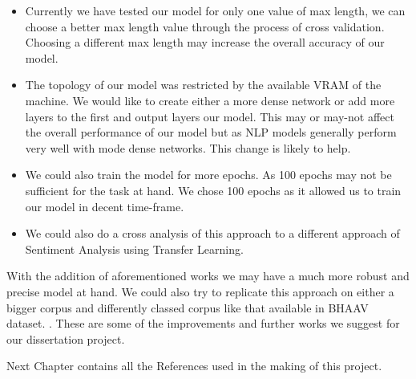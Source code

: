 \documentclass[a4paper, 12pt]{article}
\begin{document}
\begin{sloppypar}
\begin{itemize}
  \item Currently we have tested our model for only one value of max length, we can choose a better max length value through the process of cross validation. Choosing a different max length may increase the overall accuracy of our model.
  
  \item The topology of our model was restricted by the available VRAM of the machine. We would like to create either a more dense network or add more layers to the first and output layers our model. This may or may-not affect the overall performance of our model but as NLP models generally perform very well with mode dense networks. This change is likely to help.
  
  \item We could also train the model for more epochs. As 100 epochs may not be sufficient for the task at hand. We chose 100 epochs as it allowed us to train our model in decent time-frame.
  
  \item We could also do a cross analysis of this approach to a different approach of Sentiment Analysis using Transfer Learning.
  \end{itemize}   
  With the addition of aforementioned works we may have a much more robust and precise model at hand. We could also try to replicate this approach on either a bigger corpus and differently classed corpus like that available in BHAAV dataset. \cite{kumar_bhaav_2019}. These are some of the improvements and further works we suggest for our dissertation project.
  
  Next Chapter contains all the References used in the making of this project.

\clearpage
\printbibliography[heading=bibintoc]
\clearpage

\end{sloppypar}
\end{document}
